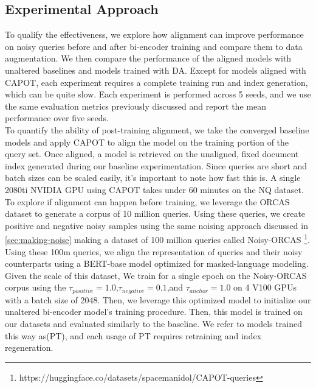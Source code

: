 \subsection{Experimental Approach}
\label{sec:ea}
To qualify the effectiveness, we explore how alignment can improve performance on noisy queries before and after bi-encoder training and compare them to data augmentation. We then compare the performance of the aligned models with unaltered baselines and models trained with DA. Except for models aligned with CAPOT, each experiment requires a complete training run and index generation, which can be quite slow. Each experiment is performed across 5 seeds, and we use the same evaluation metrics previously discussed and report the mean performance over five seeds.   \\
To quantify the ability of post-training alignment, we take the converged baseline models and apply CAPOT 
to align the model on the training portion of the query set. Once aligned, a model is retrieved on the unaligned, fixed document index generated during our baseline experimentation. Since queries are short and batch sizes can be scaled easily, it's important to note how fast this is. A single 2080ti NVIDIA GPU using CAPOT takes under 60 minutes on the NQ dataset. \\ 
To explore if alignment can happen before training, we leverage the ORCAS \cite{craswell2020orcas} dataset to generate a corpus of 10 million queries. Using these queries, we create positive and negative noisy samples using the same noising approach discussed in \ref{sec:making-noise} making a dataset of 100 million queries called Noisy-ORCAS \footnote{https://huggingface.co/datasets/spacemanidol/CAPOT-queries}. Using these 100m queries, we align the representation of queries and their noisy counterparts using a BERT-base model optimized for masked-language modeling. Given the scale of this dataset, We train for a single epoch on the Noisy-ORCAS corpus using the $\tau_{positive}=1.0$,$\tau_{negative}=0.1$,and $\tau_{anchor}=1.0$ on 4 V100 GPUs with a batch size of 2048. Then, we leverage this optimized model to initialize our unaltered bi-encoder model's training procedure. Then, this model is trained on our datasets and evaluated similarly to the baseline.  We refer to models trained this way as(PT), and each usage of PT requires retraining and index regeneration. 
